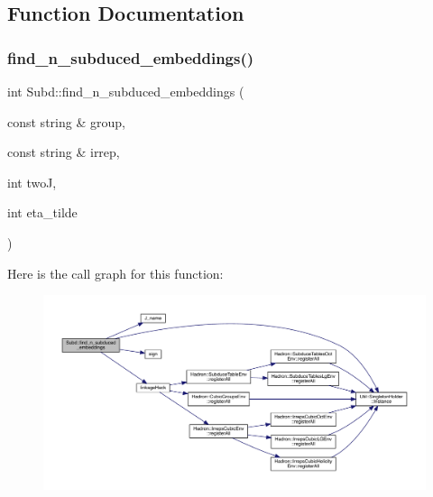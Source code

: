 \subsection{Function Documentation}
\mbox{\label{namespaceSubd_a7a3fcd97f1cf40eb963e278240d0ff3e}} 
\subsubsection{\texorpdfstring{find\_n\_subduced\_embeddings()}{find\_n\_subduced\_embeddings()}}
{\footnotesize\ttfamily int Subd\+::find\+\_\+n\+\_\+subduced\+\_\+embeddings (\begin{DoxyParamCaption}\item[{const string \&}]{group,  }\item[{const string \&}]{irrep,  }\item[{int}]{twoJ,  }\item[{int}]{eta\+\_\+tilde }\end{DoxyParamCaption})}

Here is the call graph for this function\+:
\nopagebreak
\begin{figure}[H]
\begin{center}
\leavevmode
\includegraphics[width=350pt]{d8/d2b/namespaceSubd_a7a3fcd97f1cf40eb963e278240d0ff3e_cgraph}
\end{center}
\end{figure}
\mbox{\label{namespaceSubd_a16b9b11dade3168c5507f7cf509b1a2e}} 
